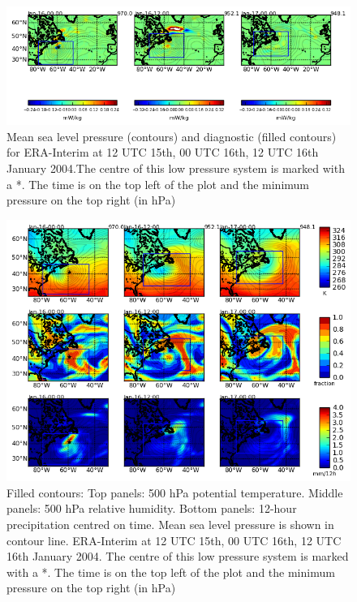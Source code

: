 \begin{figure}
	\includegraphics[width=36pc,angle=0]{plot_var_poly_ERA_diag500_msl_12UTC_15.png} %
	\caption{Mean sea level pressure (contours) and diagnostic (filled contours) for ERA-Interim at 12 UTC 15th, 00 UTC 16th, 12 UTC 16th January 2004.The centre of this low pressure system is marked with a *. The time is on the top left of the plot and the minimum pressure on the top right (in hPa)}\label{fig:ERA_diag}
	\centering
\end{figure}

\begin{figure}	%
	\includegraphics[width=36pc,angle=0]{plot_var_poly_ERA_ptRHprecip_12UTC_15.png}
	\caption{Filled contours: Top panels: 500 hPa potential temperature. Middle panels: 500 hPa relative humidity. Bottom panels: 12-hour precipitation centred on time. Mean sea level pressure is shown in contour line. ERA-Interim at 12 UTC 15th, 00 UTC 16th, 12 UTC 16th January 2004. The centre of this low pressure system is marked with a *. The time is on the top left of the plot and the minimum pressure on the top right (in hPa)}\label{fig:ERA_pt_RH_precip}
	\centering
\end{figure}

